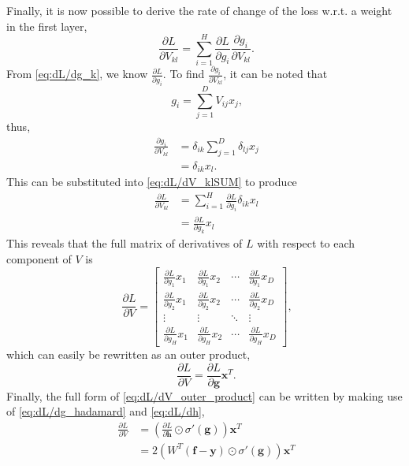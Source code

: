 \documentclass{article}
\begin{document}
\vspace{10pt}
Finally, it is now possible to derive the rate of change of the loss w.r.t. a weight in the first layer,
\begin{equation}
\label{eq:dL/dV_klSUM}
    \phantom{.}\frac{\partial L}{\partial V_{kl}} = \displaystyle\sum_{i=1}^H\frac{\partial L}{\partial g_i}\frac{\partial g_i}{\partial V_{kl}}.
\end{equation}
From \cref{eq:dL/dg_k}, we know $\frac{\partial L}{\partial g_i}$. To find $\frac{\partial g_i}{\partial V_{kl}}$, it can be noted that
\begin{equation}
    \phantom{,}g_i = \displaystyle\sum_{j=1}^D V_{ij}x_j,
\end{equation}
thus,
\begin{align}
\label{eq:dg_i/dV_kl}
    \phantom{.}\frac{\partial g_i}{\partial V_{kl}} &= \delta_{ik}\displaystyle\sum_{j=1}^D \delta_{lj}x_j \\&=
    \delta_{ik}x_l.
\end{align}
This can be substituted into \cref{eq:dL/dV_klSUM} to produce
\begin{align}
    \phantom{.}\frac{\partial L}{\partial V_{kl}} &= \displaystyle\sum_{i=1}^H\frac{\partial L}{\partial g_i}\delta_{ik}x_l \\
    &= \frac{\partial L}{\partial g_k}x_l
\end{align}
This reveals that the full matrix of derivatives of $L$ with respect to each component of $V$ is
\begin{equation}
    \phantom{,}\frac{\partial L}{\partial V} =
    \begin{bmatrix}
        \frac{\partial L}{\partial g_1}x_1 & \frac{\partial L}{\partial g_1}x_2 & \cdots & \frac{\partial L}{\partial g_1}x_D \\[0.5em]
        \frac{\partial L}{\partial g_2}x_1 & \frac{\partial L}{\partial g_2}x_2 & \cdots & \frac{\partial L}{\partial g_2}x_D \\[0.5em]
        \vdots & \vdots & \ddots & \vdots \\[0.5em]
        \frac{\partial L}{\partial g_H}x_1 & \frac{\partial L}{\partial g_H}x_2 & \cdots & \frac{\partial L}{\partial g_H}x_D
    \end{bmatrix},
\end{equation}
which can easily be rewritten as an outer product,
\begin{equation}
\label{eq:dL/dV_outer_product}
    \phantom{.}\frac{\partial L}{\partial V} = \frac{\partial L}{\partial \mathbf{g}}\mathbf{x}^T.
\end{equation}
Finally, the full form of \cref{eq:dL/dV_outer_product} can be written by making use of \cref{eq:dL/dg_hadamard} and \cref{eq:dL/dh},
\begin{align}
\label{eq:dL/dV}
    \phantom{.}\frac{\partial L}{\partial V} &= \left(\frac{\partial L}{\partial \mathbf{h}}\odot\sigma'(\mathbf{g})\right)\mathbf{x}^T \\
    &= 2\left({W}^T(\mathbf{f} - \mathbf{y})\odot\sigma'(\mathbf{g})\right)\mathbf{x}^T
\end{align}
\end{document}
